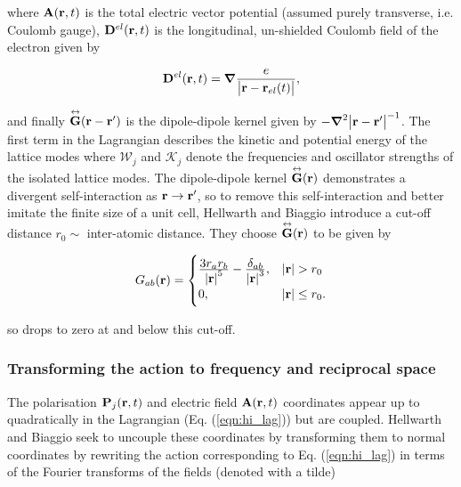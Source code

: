 where $\vb{A}(\vb{r}, t)$ is the total electric vector potential (assumed purely transverse, i.e. Coulomb gauge), $\vb{D}^{el}(\vb{r}, t)$ is the longitudinal, un-shielded Coulomb field of the electron given by

\begin{equation}
    \vb{D}^{el}(\vb{r}, t) = \grad \frac{e}{\abs{\vb{r} - \vb{r}_{el}(t)}},
\end{equation}

and finally $\overset{\leftrightarrow}{\vb{G}}(\vb{r} - \vb{r'})$ is the dipole-dipole kernel given by $-\grad^2 \abs{\vb{r} - \vb{r}'}^{-1}$. The first term in the Lagrangian describes the kinetic and potential energy of the lattice modes where $\mathcal{W}_j$ and  $\mathcal{K}_j$ denote the frequencies and oscillator strengths of the isolated lattice modes. The dipole-dipole kernel $\overset{\leftrightarrow}{\vb{G}}(\vb{r})$ demonstrates a divergent self-interaction as $\vb{r} \to \vb{r'}$, so to remove this self-interaction and better imitate the finite size of a unit cell, Hellwarth and Biaggio introduce a cut-off distance $r_0 \sim$ inter-atomic distance. They choose $\overset{\leftrightarrow}{\vb{G}}(\vb{r})$ to be given by

\begin{equation}
    G_{ab}(\vb{r}) = 
    \begin{cases}
        \frac{\displaystyle 3r_a r_b}{\displaystyle \abs{\vb{r}}^5} - \frac{\displaystyle \delta_{ab}}{\displaystyle \abs{\vb{r}}^3}, & \abs{\vb{r}} > r_0 \\
        0, & \abs{\vb{r}} \leq r_0.
    \end{cases}
\end{equation}

so drops to zero at and below this cut-off.

\subsubsection{Transforming the action to frequency and reciprocal space}
\label{subsubsec:2-3-3-2}

The polarisation $\vb{P}_j(\vb{r}, t)$ and electric field $\vb{A}(\vb{r}, t)$ coordinates appear up to quadratically in the Lagrangian (Eq. (\ref{eqn:hi_lag})) but are coupled. Hellwarth and Biaggio seek to uncouple these coordinates by transforming them to normal coordinates by rewriting the action corresponding to Eq. (\ref{eqn:hi_lag}) in terms of the Fourier transforms of the fields (denoted with a tilde)

